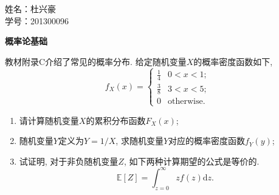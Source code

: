 \documentclass[answers]{exam}  %
\begin{document}
\Large
\noindent 
姓名：杜兴豪 \\
学号：201300096 \\
\begin{questions}
\question [30] \textbf{概率论基础}

	教材附录C介绍了常见的概率分布.
给定随机变量$X$的概率密度函数如下,
\begin{equation}
	f_X(x) = 
	\begin{cases}
		\frac{1}{4} & 0<x<1;\\
		\frac{3}{8} & 3<x<5;\\
		0			& \mbox{otherwise.}
	\end{cases}
\end{equation}

\begin{enumerate}
\item  请计算随机变量$X$的累积分布函数$F_X(x)$;
\item  随机变量$Y$定义为$Y = 1/X$, 求随机变量$Y$对应的概率密度函数$f_Y(y)$;
\item  试证明, 对于非负随机变量$Z$, 如下两种计算期望的公式是等价的.
\begin{equation}
	\label{ch1-eq-expect-1}
	\mathbb{E}[Z] = \int_{z=0}^{\infty}zf(z) \mathrm{d} z.
\end{equation}


\end{enumerate}
\end{questions}
\end{document}
